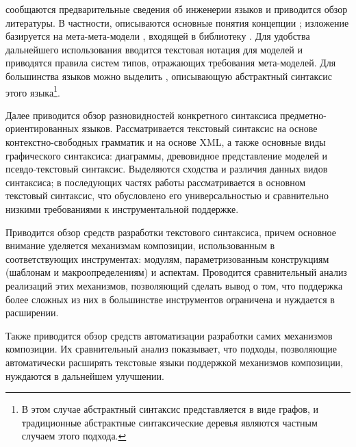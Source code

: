  сообщаются предварительные сведения об инженерии языков и приводится обзор литературы. В частности, описываются основные понятия концепции ; изложение базируется на мета-мета-модели , входящей в библиотеку . Для удобства дальнейшего использования вводится текстовая нотация для моделей и приводятся правила систем типов, отражающих требования мета-моделей. Для большинства языков можно выделить , описывающую абстрактный синтаксис этого языка\footnote{В этом случае абстрактный синтаксис представляется в виде графов, и традиционные абстрактные синтаксические деревья являются частным случаем этого подхода.}.

Далее приводится обзор разновидностей конкретного синтаксиса предметно-ориентированных языков. Рассматривается текстовый синтаксис на основе контекстно-свободных грамматик и на основе XML, а также основные виды графического синтаксиса: диаграммы, древовидное представление моделей и псевдо-текстовый синтаксис. Выделяются сходства и различия данных видов синтаксиса; в последующих частях работы рассматривается в основном текстовый синтаксис, что обусловлено его универсальностью и сравнительно низкими требованиями к инструментальной поддержке.

Приводится обзор средств разработки текстового синтаксиса, причем основное внимание уделяется механизмам композиции, использованным в соответствующих инструментах: модулям, параметризованным конструкциям (шаблонам и макроопределениям) и аспектам. Проводится сравнительный анализ реализаций этих механизмов, позволяющий сделать вывод о том, что поддержка более сложных из них в большинстве инструментов ограничена и нуждается в расширении.

Также приводится обзор средств автоматизации разработки самих механизмов композиции. Их сравнительный анализ показывает, что подходы, позволяющие автоматически расширять текстовые языки поддержкой механизмов композиции, нуждаются в дальнейшем улучшении.